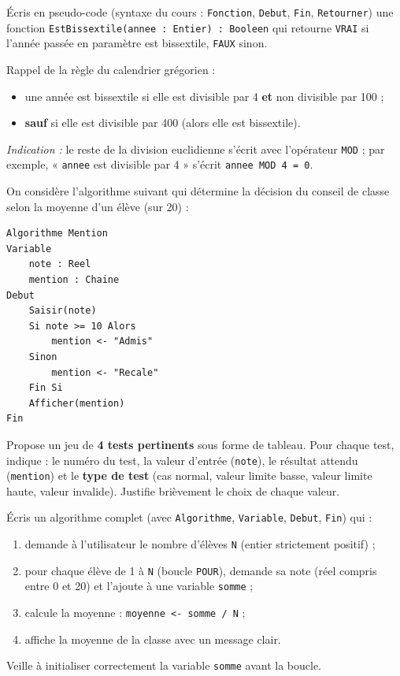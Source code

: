 \documentclass[11pt]{article}
\begin{document}
\begin{exercice}
Écris en pseudo-code (syntaxe du cours : \texttt{Fonction}, \texttt{Debut}, \texttt{Fin}, \texttt{Retourner}) une fonction \texttt{EstBissextile(annee : Entier) : Booleen} qui retourne \texttt{VRAI} si l'année passée en paramètre est bissextile, \texttt{FAUX} sinon.

Rappel de la règle du calendrier grégorien :
\begin{itemize}
    \item une année est bissextile si elle est divisible par 4 \textbf{et} non divisible par 100 ;
    \item \textbf{sauf} si elle est divisible par 400 (alors elle est bissextile).
\end{itemize}
\emph{Indication :} le reste de la division euclidienne s'écrit avec l'opérateur \texttt{MOD} ; par exemple, « \texttt{annee} est divisible par 4 » s'écrit \texttt{annee MOD 4 = 0}.
\end{exercice}

\begin{exercice}
On considère l'algorithme suivant qui détermine la décision du conseil de classe selon la moyenne d'un élève (sur 20) :
\begin{lstlisting}
Algorithme Mention
Variable
    note : Reel
    mention : Chaine
Debut
    Saisir(note)
    Si note >= 10 Alors
        mention <- "Admis"
    Sinon
        mention <- "Recale"
    Fin Si
    Afficher(mention)
Fin
\end{lstlisting}
Propose un jeu de \textbf{4 tests pertinents} sous forme de tableau. Pour chaque test, indique : le numéro du test, la valeur d'entrée (\texttt{note}), le résultat attendu (\texttt{mention}) et le \textbf{type de test} (cas normal, valeur limite basse, valeur limite haute, valeur invalide). Justifie brièvement le choix de chaque valeur.
\end{exercice}

\begin{exercice}
Écris un algorithme complet (avec \texttt{Algorithme}, \texttt{Variable}, \texttt{Debut}, \texttt{Fin}) qui :
\begin{enumerate}
    \item demande à l'utilisateur le nombre d'élèves \texttt{N} (entier strictement positif) ;
    \item pour chaque élève de 1 à \texttt{N} (boucle \texttt{POUR}), demande sa note (réel compris entre 0 et 20) et l'ajoute à une variable \texttt{somme} ;
    \item calcule la moyenne : \texttt{moyenne <- somme / N} ;
    \item affiche la moyenne de la classe avec un message clair.
\end{enumerate}
Veille à initialiser correctement la variable \texttt{somme} avant la boucle.
\end{exercice}
\end{document}
